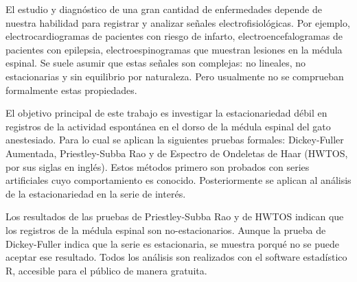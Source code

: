 % 
% 
%

El estudio y diagnóstico de una gran cantidad de enfermedades depende de nuestra habilidad para
registrar y analizar se\~nales electrofisiol\'ogicas. Por ejemplo, electrocardiogramas
de pacientes con riesgo de infarto, electroencefalogramas de pacientes con epilepsia,
electroespinogramas que muestran lesiones en la m\'edula espinal.
Se suele asumir que estas se\~nales son complejas: no lineales, no estacionarias y
sin equilibrio por naturaleza. Pero usualmente no se comprueban formalmente estas propiedades.

El objetivo principal de este trabajo es investigar la estacionariedad d\'ebil
en registros de la actividad espont\'anea en el dorso de la m\'edula espinal del gato anestesiado.
Para lo cual se aplican la siguientes pruebas formales: %
Dickey-Fuller Aumentada, Priestley-Subba Rao y
de Espectro de Ondeletas de Haar (HWTOS, por sus siglas en ingl\'es).
 Estos m\'etodos primero son probados con series artificiales cuyo comportamiento es conocido.
Posteriormente
se aplican al an\'alisis de la estacionariedad en la serie de inter\'es.

Los resultados de las pruebas de Priestley-Subba Rao y de HWTOS indican que los registros de la m\'edula espinal son no-estacionarios. Aunque la prueba de Dickey-Fuller indica que la serie es estacionaria, 
se muestra  %
porqu\'e no se puede aceptar ese resultado.
Todos los an\'alisis son realizados con el software estad\'istico R, accesible para el p\'ublico de manera gratuita.

